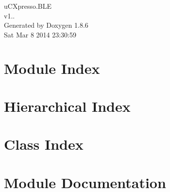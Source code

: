 \documentclass[twoside]{book}
\newcommand{\clearemptydoublepage}{%
  \newpage{\pagestyle{empty}\cleardoublepage}%
}
\begin{document}
\hypersetup{pageanchor=false}
\begin{titlepage}
\vspace*{7cm}
\begin{center}%
{\Large u\-C\-Xpresso.\-B\-L\-E \\[1ex]\large v1.. }\\
\vspace*{1cm}
{\large Generated by Doxygen 1.8.6}\\
\vspace*{0.5cm}
{\small Sat Mar 8 2014 23:30:59}\\
\end{center}
\end{titlepage}
\clearemptydoublepage
\tableofcontents
\clearemptydoublepage
{}
\hypersetup{pageanchor=true}

\chapter{Module Index}

\chapter{Hierarchical Index}

\chapter{Class Index}

\chapter{Module Documentation}

\end{document}
